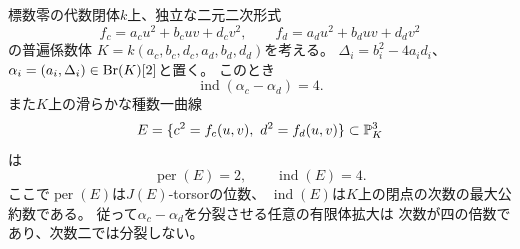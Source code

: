 \begin{theorem}
\label{thm:qa-generic-point-period-two-index-four}
標数零の代数閉体$k$上、独立な二元二次形式
\[
 f_c=a_cu^2+b_cuv+d_cv^2,\qquad
 f_d=a_du^2+b_duv+d_dv^2
\]
の普遍係数体
$K=k(a_c,b_c,d_c,a_d,b_d,d_d)$を考える。
$\Delta_i=b_i^2-4a_id_i$、
$\alpha_i=(a_i,\Delta_i)\in\operatorname{Br}(K)[2]$と置く。
このとき
\begin{equation}
 \boxed{\operatorname{ind}(\alpha_c-\alpha_d)=4}.
 \label{eq:qa-biquaternion-index-four}
\end{equation}
また$K$上の滑らかな種数一曲線
\[
 E=\{c^2=f_c(u,v),\ d^2=f_d(u,v)\}\subset\PP^3_K
\]
は
\begin{equation}
 \boxed{\operatorname{per}(E)=2,\qquad
        \operatorname{ind}(E)=4}.
 \label{eq:qa-point-period-index-24}
\end{equation}
ここで$\operatorname{per}(E)$は$J(E)$-torsorの位数、
$\operatorname{ind}(E)$は$K$上の閉点の次数の最大公約数である。
従って$\alpha_c-\alpha_d$を分裂させる任意の有限体拡大は
次数が四の倍数であり、次数二では分裂しない。
\end{theorem}
